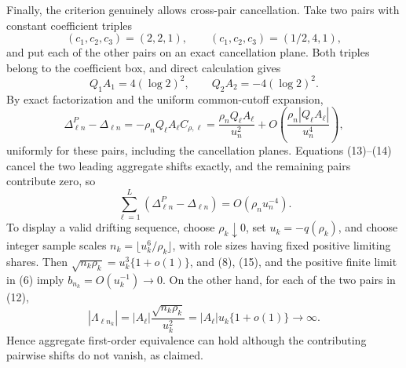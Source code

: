 Finally, the criterion genuinely allows cross-pair cancellation.  Take two
pairs with constant coefficient triples
\[
 (c_1,c_2,c_3)=(2,2,1),
 \qquad
 (c_1,c_2,c_3)=(1/2,4,1),
 \tag{12}
\]
and put each of the other pairs on an exact cancellation plane.  Both triples
belong to the coefficient box, and direct calculation gives
\[
 Q_1A_1=4(\log2)^2,
 \qquad
 Q_2A_2=-4(\log2)^2.
 \tag{13}
\]
By exact factorization and the uniform common-cutoff expansion,
\[
 \Delta^{P}_{\ell n}-\Delta_{\ell n}
 =-\rho_nQ_\ell A_\ell C_{\rho,\ell}
 =\frac{\rho_nQ_\ell A_\ell}{u_n^2}
   +O\!\left(\frac{\rho_n|Q_\ell A_\ell|}{u_n^4}\right),
 \tag{14}
\]
uniformly for these pairs, including the cancellation planes.  Equations
(13)--(14) cancel the two leading aggregate shifts exactly, and the remaining
pairs contribute zero, so
\[
 \sum_{\ell=1}^{L}(\Delta^{P}_{\ell n}-\Delta_{\ell n})
 =O(\rho_nu_n^{-4}).
 \tag{15}
\]
To display a valid drifting sequence, choose \(\rho_k\downarrow0\), set
\(u_k=-q(\rho_k)\), and choose integer sample scales
\(n_k=\lfloor u_k^6/\rho_k\rfloor\), with role sizes having fixed positive
limiting shares.  Then
\(\sqrt{n_k\rho_k}=u_k^3\{1+o(1)\}\), and (8), (15), and the positive finite
limit in (6) imply \(b_{n_k}=O(u_k^{-1})\to0\).  On the other hand, for each
of the two pairs in (12),
\[
 |\Lambda_{\ell n_k}|
 =|A_\ell|\frac{\sqrt{n_k\rho_k}}{u_k^2}
 =|A_\ell|u_k\{1+o(1)\}\longrightarrow\infty.
 \tag{16}
\]
Hence aggregate first-order equivalence can hold although the contributing
pairwise shifts do not vanish, as claimed.
